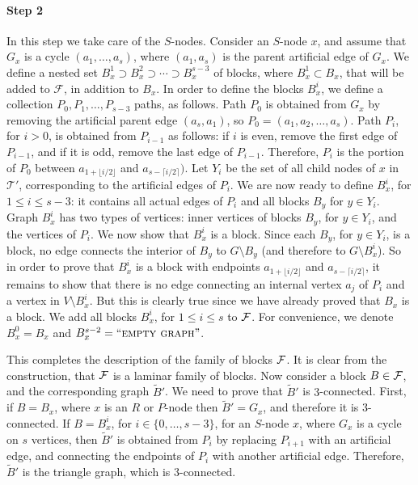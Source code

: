 \documentclass[twoside,leqno,twocolumn]{article}
\newcommand{\tset}{{\mathcal T}}
\newcommand{\fset}{{\mathcal{F}}}
\begin{document}
\paragraph{Step 2} In this step we take care of the $S$-nodes. Consider an $S$-node $x$, and assume that $G_x$ is a cycle
$(a_1,\dots, a_s)$, where $(a_1,a_s)$ is the parent artificial edge of $G_x$. We define a nested set $B^1_x\supset B^2_x\supset\cdots\supset B^{s-3}_x$ of blocks, where $B^1_x\subset B_x$, that will be added to $\fset$, in addition to $B_x$. In order to define the blocks $B^i_x$, we define a collection $P_0,P_1,\ldots,P_{s-3}$ paths, as follows. Path $P_0$ is obtained from $G_x$ by removing the artificial parent edge $(a_s,a_1)$, so $P_0=(a_1,a_2,\ldots,a_s)$. Path $P_i$, for $i> 0$, is obtained from $P_{i-1}$ as follows: if $i$ is even, remove the first edge of $P_{i-1}$, and if it is odd, remove the last edge of $P_{i-1}$. Therefore, $P_i$ is the portion of $P_0$ between $a_{1 + \lfloor i/2 \rfloor}$ and $a_{s-\lceil i/2 \rceil})$. Let $Y_i$ be the set of all child nodes of $x$ in $\tset'$, corresponding to the artificial edges of $P_i$.
We are now ready to define $B^i_x$, for $1\leq i\leq s-3$: it contains all actual edges of $P_i$ and
all blocks $B_y$ for $y\in Y_i$. 
Graph $B_x^i$ has two types of vertices: inner vertices of blocks $B_y$, for $y\in Y_i$, and
the vertices of $P_i$. 
We now show that $B_x^i$ is a block. Since each $B_y$, for $y\in Y_i$, is a block, no edge connects the interior of $B_y$
to $G \setminus B_y$ (and therefore to $G \setminus B^i_x$). So in order to prove that
$B^i_x$ is a block with endpoints $a_{1 + \lfloor i/2 \rfloor}$ and $a_{s-\lceil i/2 \rceil}$,
it remains to show that there is no edge connecting an internal vertex $a_j$ of $P_i$ and 
a vertex in $V \setminus B_x^i$. But this is clearly true since we have already proved that $B_x$ is a block.
We add all blocks $B_x^i$, for $1\leq i\leq s$ to $\cal F$.
For convenience, we denote $B_x^0 = B_x$ and $B_x^{s-2} = \text{``\textsc{empty graph}''}$.

This completes the description of the family of blocks $\cal F$.
It is clear from the construction, that $\cal F$ is a laminar family of blocks.
Now consider a block $B\in \cal F$, and the corresponding graph $\tilde{B}'$. We need to prove that $\tilde{B}'$ is $3$-connected. First,
if $B=B_x$, where $x$ is an $R$ or $P$-node then $\tilde{B}' = G_x$, and therefore it is 3-connected. 
If $B=B_x^i$, for $i\in \{0,\dots, s-3\}$, for an $S$-node $x$, where $G_x$ is a cycle on $s$ vertices, then $\tilde{B}'$ is obtained from $P_i$ by replacing $P_{i+1}$ with an artificial edge, and connecting the endpoints of $P_i$ with another artificial edge. Therefore, $\tilde{B}'$ is the triangle graph, which is $3$-connected.
\end{document}
